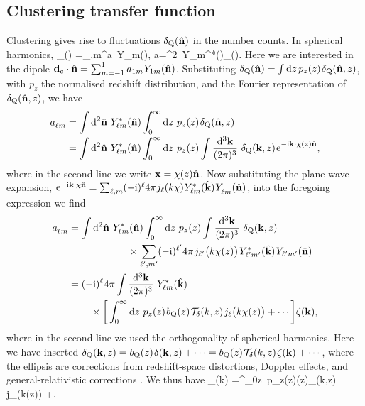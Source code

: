 \subsection{Clustering transfer function} 
Clustering gives rise to fluctuations $\delta_{\rm{Q}}(\hat{\mathbf{n}})$ in the number counts. In spherical harmonics,
\be
	\delta_\qso(\n)
	=\sum_{\ell,m}^\infty a\, Y_{\ell m}(\n),
\quad
	a=\int\dif^2\n~Y_{\ell m}^*(\n)\ssp\delta_\qso(\n).
\ee
Here we are interested in the dipole $\mathbf{d}_{{\rm c}}\cdot\hat{\mathbf{n}}=\sum_{m=-1}^1 a_{1m}\hspace{0.06em} Y_{1m}(\hat{\mathbf{n}})$.
Substituting $\delta_{\rm{Q}}(\hat{\mathbf{n}})=\int\mathrm{d} z\,p_z(z)\hspace{0.09em}\delta_{\rm{Q}}(\hat{\mathbf{n}},z)$, with $p_z$ the
normalised redshift distribution, and the Fourier
representation of $\delta_{\rm{Q}}(\hat{\mathbf{n}},z)$, we have
\begin{align*}
a\Z{\ell m}
&=\int\dif^2\n~Y_{\ell m}^*(\n)\int^\infty_0\dif z~p_z(z)\ssp\delta_\qso(\n,z) \nonumber\\[-2pt]
&=\int\dif^2\n~Y_{\ell m}^*(\n)\int^\infty_0\dif z~p_z(z)\int\frac{\dif^3\bk}{(2\pi)^3}~
	{\delta_\qso}(\bk,z)\ssp \rme\Zu{-\im\bk\cdot\chi(z)\n},
\end{align*}
where in the second line we write $\mathbf{x}=\chi(z)\hat{\mathbf{n}}$.
Now substituting the plane-wave expansion,
$\rme^{-\im\bk\cdot\chi\n}
=\sum_{\ell,m}(-\im)^{\ell}4\pi\sp j_{\ell}(k\chi)\sp
Y^*_{\ell m}(\hat\bk)\sp Y^{\phantom*}\Z{\ell m}(\n)$,
into the foregoing expression we find
\begin{align*}
a\Z{\ell m}
&=\int\dif^2\n~Y_{\ell m}^*(\n)
	\int^\infty_0\dif z~p_z(z)\int\frac{\dif^3\bk}{(2\pi)^3}~{\delta_\qso}(\bk,z) \nonumber\\
	&\qquad\qquad\qquad\times\sum_{\ell',m'}(-\im)^{\ell'}4\pi\ssp j_{\ell'}\big(k\chi(z)\big)\ssp
	Y^*_{\ell'm'}(\hat{\bk})\ssp Y_{\ell'm'}(\n) \nonumber\\
&=(-\im)^\ell\sp 4\pi\int\frac{\dif^3\bk}{(2\pi)^3}\ Y^*_{\ell m}(\hat{\bk}) \nonumber\\
	&\qquad\:\times\bigg[\int^\infty_0\dif z~p_z(z)\ssp \bqso(z)\ssp\mathcal{T}_\delta(k,z)\ssp
			j_\ell\big(k\chi(z)\big)+\cdots\bigg]\zeta(\bk),
\end{align*}
where in the second line we used the
orthogonality of spherical harmonics.
Here we have inserted
$\delta_{\rm{Q}}(\mathbf{k},z)=b_{\rm{Q}}(z)\hspace{0.09em}\delta(\mathbf{k},z)+\cdots=b_{\rm{Q}}(z)\hspace{0.09em}\mathcal{T}_\delta(k,z)\hspace{0.09em}\zeta(\mathbf{k})+\cdots$,
where the ellipsis are corrections from 
redshift-space distortions, Doppler effects, and general-relativistic
corrections 
\citep[see, e.g.,][appendix A, for complete expressions]{CLASSgal}.
We thus have
\be
	\Delta\Zu{\clu}_\ell(k)
	=\int^\infty_0\dif z~p_z(z)\ssp\bqso(z)\ssp{}_\delta(k,z)\ssp
			j_\ell\big(k\chi(z)\big)
   +\cdots.
\ee


